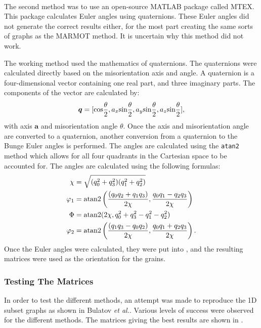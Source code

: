 \documentclass[12pt]{report}
\begin{document}
The second method was to use an open-source MATLAB\textsuperscript{\textregistered} package called MTEX.\cite{bachmann2010}  This package calculates Euler angles using quaternions.  These Euler angles did not generate the correct results either, for the most part creating the same sorts of graphs as the MARMOT method.  It is uncertain why this method did not work.

The working method used the mathematics of quaternions.\cite{weisstein2004}  The quaternions were calculated directly based on the misorientation axis and angle.  A quaternion is a four-dimensional vector containing one real part, and three imaginary parts.  The components of the vector are calculated by:
\begin{equation}
\label{eq:quat}
\bm{q}=[\textnormal{cos}\frac{\theta}{2}, a_x \textnormal{sin}\frac{\theta}{2}, a_y \textnormal{sin}\frac{\theta}{2}, a_z \textnormal{sin}\frac{\theta}{2}],
\end{equation}
with axis $\bm{a}$ and misorientation angle $\theta$.  Once the axis and misorientation angle are converted to a quaternion, another conversion from a quaternion to the Bunge Euler angles is performed.  The angles are calculated using the \verb!atan2! method which allows for all four quadrants in the Cartesian space to be accounted for.  The angles are calculated using the following formulas:
\begin{align}
\label{eq:quat2euler}
\begin{aligned}
\chi &= \sqrt{(q_0^2+q_3^2)(q_1^2+q_2^2)}\\
\varphi_1 &= \textnormal{atan2}\left(\frac{(q_0q_2+q_1q_3)}{2\chi}, \frac{q_0q_1-q_2q_3}{2\chi}\right)\\
\Phi &= \textnormal{atan2}(2\chi, q_0^2+q_3^2-q_1^2-q_2^2)\\
\varphi_2 &= \textnormal{atan2}\left(\frac{(q_1q_3-q_0q_2)}{2\chi}, \frac{q_0q_1+q_2q_3}{2\chi}\right).
\end{aligned}
\end{align}
Once the Euler angles were calculated, they were put into , and the resulting matrices were used as the orientation for the grains.

\subsubsection{Testing The Matrices}
In order to test the different methods, an attempt was made to reproduce the 1D subset graphs as shown in Bulatov \emph{et al.}.  Various levels of success were observed for the different methods.  The matrices giving the best results are shown in .
\end{document}
